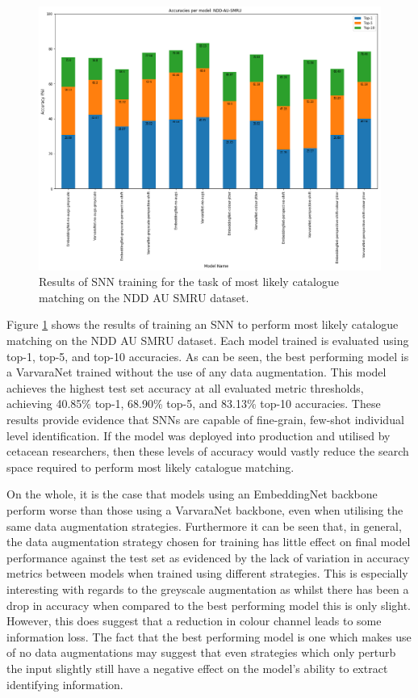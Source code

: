 \begin{figure}[t]
	\begin{center}
		\includegraphics[scale=0.4]{Chapter5/figs/NDDAUSMRU-SNN-model-accuracies.png}
	\end{center}
	\caption{Results of SNN training for the task of most likely catalogue matching on the NDD AU SMRU dataset.}
	\label{fig:NDDAUSMRU-SNN-model-accuracies}
\end{figure}

Figure \ref{fig:NDDAUSMRU-SNN-model-accuracies} shows the results of training an SNN to perform most likely catalogue matching on the NDD AU SMRU dataset. Each model trained is evaluated using top-1, top-5, and top-10 accuracies. As can be seen, the best performing model is a VarvaraNet trained without the use of any data augmentation. This model achieves the highest test set accuracy at all evaluated metric thresholds, achieving 40.85\% top-1, 68.90\% top-5, and 83.13\% top-10 accuracies. These results provide evidence that SNNs are capable of fine-grain, few-shot individual level identification. If the model was deployed into production and utilised by cetacean researchers, then these levels of accuracy would vastly reduce the search space required to perform most likely catalogue matching.

On the whole, it is the case that models using an EmbeddingNet backbone perform worse than those using a VarvaraNet backbone, even when utilising the same data augmentation strategies. Furthermore it can be seen that, in general, the data augmentation strategy chosen for training has little effect on final model performance against the test set as evidenced by the lack of variation in accuracy metrics between models when trained using different strategies. This is especially interesting with regards to the greyscale augmentation as whilst there has been a drop in accuracy when compared to the best performing model this is only slight. However, this does suggest that a reduction in colour channel leads to some information loss. The fact that the best performing model is one which makes use of no data augmentations may suggest that even strategies which only perturb the input slightly still have a negative effect on the model's ability to extract identifying information. 

